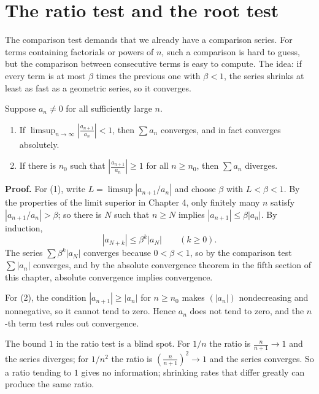 \section{The ratio test and the root test}

The comparison test demands that we already have a comparison series. For terms containing
factorials or powers of $n$, such a comparison is hard to guess, but the comparison between
consecutive terms is easy to compute. The idea: if every term is at most $\beta$ times the
previous one with $\beta<1$, the series shrinks at least as fast as a geometric series, so
it converges.

\begin{teorema}
Suppose $a_n \neq 0$ for all sufficiently large $n$.
\begin{enumerate}
\item If $\limsup_{n\to\infty} \left| \frac{a_{n+1}}{a_n} \right| < 1$, then
      $\sum a_n$ converges, and in fact converges absolutely.
\item If there is $n_0$ such that $\left| \frac{a_{n+1}}{a_n} \right| \ge 1$ for all
      $n \ge n_0$, then $\sum a_n$ diverges.
\end{enumerate}
\end{teorema}

\noindent\textbf{Proof.} For (1), write $L = \limsup |a_{n+1}/a_n|$ and choose $\beta$ with
$L < \beta < 1$. By the properties of the limit superior in Chapter 4, only finitely many
$n$ satisfy $|a_{n+1}/a_n| > \beta$; so there is $N$ such that $n \ge N$ implies
$|a_{n+1}| \le \beta |a_n|$. By induction,
\[
  |a_{N+k}| \le \beta^{k} |a_N| \qquad (k \ge 0).
\]
The series $\sum \beta^k |a_N|$ converges because $0<\beta<1$, so by the comparison test
$\sum |a_n|$ converges, and by the absolute convergence theorem in the fifth section of
this chapter, absolute convergence implies convergence.

For (2), the condition $|a_{n+1}| \ge |a_n|$ for $n \ge n_0$ makes $(|a_n|)$ nondecreasing
and nonnegative, so it cannot tend to zero. Hence $a_n$ does not tend to zero, and the
$n$-th term test rules out convergence.


The bound $1$ in the ratio test is a blind spot. For $1/n$ the ratio is
$\frac{n}{n+1} \to 1$ and the series diverges; for $1/n^2$ the ratio is
$\left(\frac{n}{n+1}\right)^2 \to 1$ and the series converges. So a ratio tending to $1$
gives no information; shrinking rates that differ greatly can produce the same ratio.

